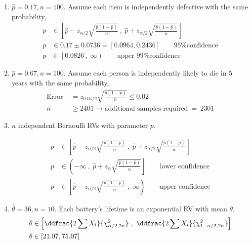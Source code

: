 \begin{enumerate}
	\item $ \widehat{p}  = 0.17, n = 100$. Assume each item is independently defective with the same probability,
	\begin{subequations}
		\begin{align}
			p &\in \left[ \widehat{p} - z_{\alpha/2}\sqrt{\frac{\widehat{p}(1-\widehat{p})}{n}}\ ,\ \widehat{p} + z_{\alpha/2}\sqrt{\frac{\widehat{p}(1-\widehat{p})}{n}}  \right] \nonumber \\
			p &\in 0.17 \pm 0.0736 = [0.0964, 0.2436] \qquad \text{95\% confidence} \\
			p &\in \left[0.0826\ ,\ \infty \right) \qquad \text{upper 99\% confidence} 
		\end{align}
	\end{subequations}

	\item $ \widehat{p}  = 0.67, n = 100$. Assume each person is independently likely to die in 5 years with the same probability,
	\begin{subequations}
		\begin{align}
			\text{Error } &= z_{0.05/2}\sqrt{\frac{\widehat{p}(1-\widehat{p})}{n}} \leq 0.02 \nonumber \\
			n &\geq 2401 \to \text{additional samples required}\ =\ 2301
		\end{align}
	\end{subequations}

	\item $ n $ independent Bernoulli RVs with parameter $ p $.
	
	\begin{subequations}
		\begin{align}
			p &\in \left[ \widehat{p} - z_{\alpha/2}\sqrt{\frac{\widehat{p}(1-\widehat{p})}{n}}\ ,\ \widehat{p} + z_{\alpha/2}\sqrt{\frac{\widehat{p}(1-\widehat{p})}{n}}  \right] \\
			p &\in \left( -\infty\ ,\ \widehat{p} + z_{\alpha}\sqrt{\frac{\widehat{p}(1-\widehat{p})}{n}}  \right] \qquad \text{lower confidence}\\
			p &\in \left[ \widehat{p} - z_{\alpha/2}\sqrt{\frac{\widehat{p}(1-\widehat{p})}{n}}\ ,\ \infty  \right) \qquad \text{upper confidence}
		\end{align}
	\end{subequations}
	
	\item $ \widehat{\theta}  = 36, n = 10$. Each battery's lifetime is an exponential RV with mean $ \theta $,
	\begin{subequations}
		\begin{align}
			\theta &\in \left[\ddfrac{2 \sum X_i}{\chi^2_{\alpha/2, 2n}}\ ,\ \ddfrac{2 \sum X_i}{\chi^2_{1 - \alpha/2, 2n}}\right] \nonumber \\
			\theta &\in [21.07, 75.07]
		\end{align}
	\end{subequations}
	

\end{enumerate}
